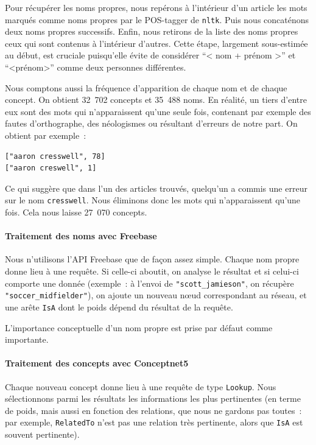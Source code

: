 \documentclass[a4paper, 12pt]{article}
\newcommand{\pyt}[1]{\texttt{#1}}%
\begin{document}
Pour récupérer les noms propres, nous repérons à l'intérieur d'un article les mots marqués comme noms propres par le POS-tagger de \pyt{nltk}. Puis nous concaténons deux noms propres successifs. Enfin, nous retirons de la liste des noms propres ceux qui sont contenus à l'intérieur d'autres. Cette étape, largement sous-estimée au début, est cruciale puisqu'elle évite de considérer ``< nom + prénom >'' et ``<prénom>'' comme deux personnes différentes.

Nous comptons aussi la fréquence d'apparition de chaque nom et de chaque concept. 
On obtient 32~702 concepts et 35~488 noms. En réalité, un tiers d'entre eux sont des mots qui n'apparaissent qu'une seule fois, contenant par exemple des fautes d'orthographe, des néologismes ou résultant d'erreurs de notre part. On obtient par exemple~:
\begin{verbatim}
["aaron cresswell", 78]
["aaron creswell", 1]
\end{verbatim}
Ce qui suggère que dans l'un des articles trouvés, quelqu'un a commis une erreur sur le nom \verb|cresswell|. Nous éliminons donc les mots qui n'apparaissent qu'une fois. Cela nous laisse 27~070 concepts.

\paragraph{Traitement des noms avec Freebase}

Nous n'utilisons l'API Freebase que de fa\c{c}on assez simple. Chaque nom propre donne lieu à une requête. Si celle-ci aboutit, on analyse le résultat et si celui-ci comporte une donnée (exemple~: à l'envoi de \verb|"scott_jamieson"|, on récupère \verb|"soccer_midfielder"|), on ajoute un nouveau n\oe{}ud correspondant au réseau, et une arête \verb|IsA| dont le poids dépend du résultat de la requête.

L'importance conceptuelle d'un nom propre est prise par défaut comme importante.

\paragraph{Traitement des concepts avec Conceptnet5}

Chaque nouveau concept donne lieu à une requête de type \verb|Lookup|. Nous sélectionnons parmi les résultats les informations les plus pertinentes (en terme de poids, mais aussi en fonction des relations, que nous ne gardons pas toutes~: par exemple, \verb|RelatedTo| n'est pas une relation très pertinente, alors que \verb|IsA| est souvent pertinente).
\end{document}

